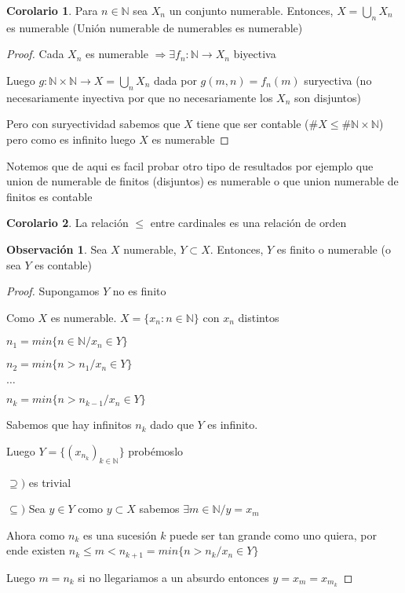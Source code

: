 \documentclass[12pt]{article}
\newcommand{\N}{\mathbb{N}}
\newcommand{\Ra}{\Rightarrow}
\newcommand{\ra}{\rightarrow}
\theoremstyle{definition}
\newtheorem*{remark}{Observación}
\newtheorem{corollary}{Corolario}[theorem]
\begin{document}
\begin{corollary}
  Para $n \in \N $ sea $X_{n}$ un conjunto numerable. Entonces, $X = \bigcup_{n} X_{n}$ es numerable (Unión numerable de numerables es numerable)

  \begin{proof}
    Cada $X_{n}$ es numerable $ \Ra \exists f_{n}: \N \ra X_{n}$ biyectiva

    Luego $g: \N \times \N \ra X = \bigcup_{n} X_{n}$ dada por $g(m,n) = f_{n}(m)$ suryectiva (no necesariamente inyectiva por que no necesariamente los $X_{n}$ son disjuntos)

    Pero con suryectividad sabemos que $X$ tiene que ser contable ($\# X \leq \# \N \times \N$) pero como es infinito luego $X$ es numerable 
  \end{proof}
  Notemos que de aqui es facil probar otro tipo de resultados por ejemplo que union de numerable de finitos (disjuntos) es numerable o que union numerable de finitos es contable 
\end{corollary}



\begin{corollary}
La relación $\leq$ entre cardinales es una relación de orden  
\end{corollary}

\begin{remark}
  Sea $X$ numerable, $Y \subset X$. Entonces, $Y$ es finito o numerable (o sea $Y$ es contable)

  \begin{proof}
    Supongamos $Y$ no es finito 

    Como $X$ es numerable. $X = \{x_{n} : n \in \N \}$ con $x_{n}$ distintos

    $n_{1} = min \{n \in \N / x_{n} \in Y \}$ 

    $n_{2} = min \{ n > n_{1} / x_{n} \in Y \}$

    $\dots$

    $ n_{k} = min \{ n > n_{k -1} / x_{n} \in Y \}$

    Sabemos que hay infinitos $n_{k}$ dado que $Y$ es infinito.

    Luego $Y = \{ (x_{n_{k}})_{k \in \N} \}$ probémoslo 
  
  $\supseteq ) $ es trivial

$\subseteq) $ Sea $y \in Y$ como $y \subset X$ sabemos $\exists m \in \N  / y = x_{m}$

Ahora como $n_{k}$ es una sucesión $k$ puede ser tan grande como uno quiera, por ende existen $n_{k} \leq m < n_{k + 1} = min \{n > n_{k} / x_{n} \in Y\}$ 

Luego $m = n_{k}$ si no llegariamos a un absurdo entonces $y = x_{m} = x_{m_{k}}$



  \end{proof}
\end{remark}
\end{document}
